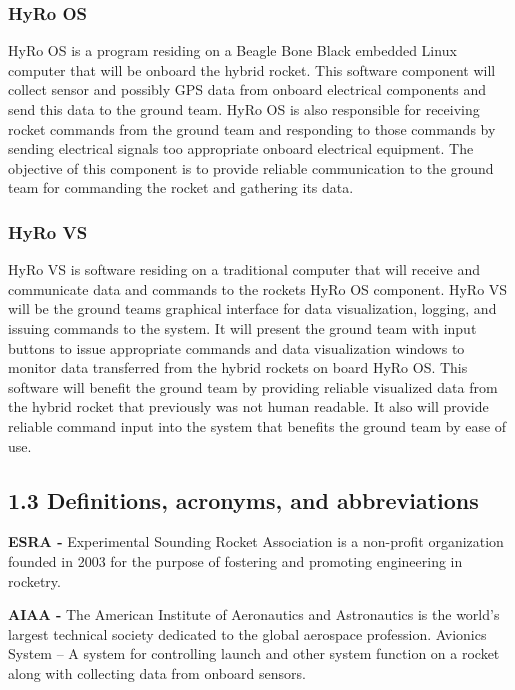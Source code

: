 \documentclass[10pt,draftclsnofoot,onecolumn]{IEEEtran}
\begin{document}
\subsubsection{HyRo OS}
 HyRo OS is a program residing on a Beagle Bone Black embedded Linux computer that will be onboard the hybrid rocket. This software component will collect sensor and possibly
 GPS data from onboard electrical components and send this data to the ground team. HyRo OS is also responsible for receiving rocket commands from the ground team and responding to those
 commands by sending electrical signals too appropriate onboard electrical equipment. The objective of this component is to provide reliable communication to the ground team for commanding
 the rocket and gathering its data. 
\subsubsection{HyRo VS}
HyRo VS is software residing on a traditional computer that will receive and communicate data and commands to the rockets HyRo OS component. HyRo VS will be the ground
 teams graphical interface for data visualization, logging, and issuing commands to the system. It will present the ground team with input buttons to issue appropriate commands and data
 visualization windows to monitor data transferred from the hybrid rockets on board HyRo OS. This software will benefit the ground team by providing reliable visualized data from the 
 hybrid rocket that previously was not human readable. It also will provide reliable command input into the system that benefits the ground team by ease of use.
\subsection{1.3  Definitions, acronyms, and abbreviations}
{\bf ESRA -}  Experimental Sounding Rocket Association is a non-profit organization founded in 2003 for the purpose of fostering and promoting engineering in rocketry. \par

{\bf AIAA -} The American Institute of Aeronautics and Astronautics is the world's largest technical society dedicated to the global aerospace profession.
Avionics System –  A system for controlling launch and other system function on a rocket along with collecting data from onboard sensors.\par
\end{document}
